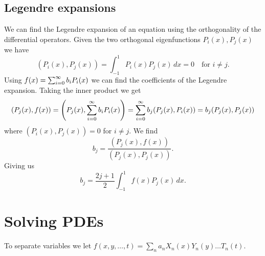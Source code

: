\documentclass[10pt, a4paper]{article}
\begin{document}
\subsection{Legendre expansions}
We can find the Legendre expansion of an equation using the orthogonality of the differential operators.
Given the two orthogonal eigenfunctions $P_i(x), P_j(x)$ we have
\[
(P_i(x), P_j(x)) = \int_{-1}^{1}P_i(x)P_j(x)\,dx = 0\quad\text{for $i \neq j$}.
\]
Using $f(x) = \infsum[i = 0]b_iP_i(x)$ we can find the coefficients of the Legendre expansion.
Taking the inner product we get
\[
(P_j(x), f(x)) = \left(P_j(x), \infsum[i = 0]b_iP_i(x)\right) = \infsum[i = 0]b_j(P_j(x), P_i(x)) = b_j(P_j(x), P_j(x))
\]
where $(P_i(x), P_j(x)) = 0$ for $i \neq j$.
We find
\[
b_j = \frac{(P_j(x), f(x))}{(P_j(x), P_j(x))}.
\]
Giving us
\[
b_j = \frac{2j + 1}{2}\int_{-1}^{1}f(x)P_j(x)\,dx.
\]
\begin{center}
\end{center}
\hfill

\newpage

\section{Solving PDEs}

To separate variables we let $f(x, y, \dotsc, t) = \sum_na_nX_n(x)Y_n(y)\dotsc T_n(t)$.
\end{document}
